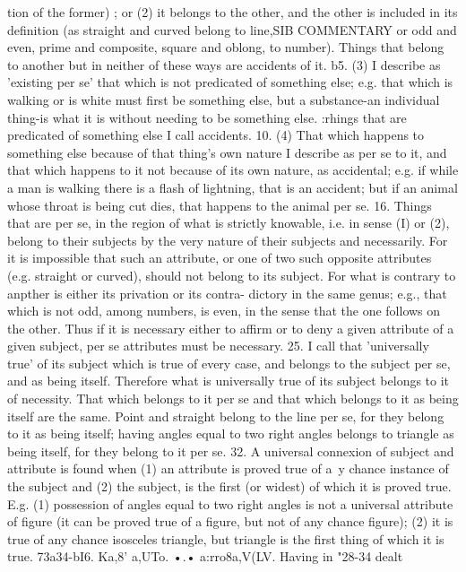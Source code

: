 {{{{tion of the former) ; or (2) it belongs to the other, and the other
is included in its definition (as straight and curved belong to line,SIB
COMMENTARY
or odd and even, prime and composite, square and oblong, to
number). Things that belong to another but in neither of these
ways are accidents of it.
b5. (3) I describe as 'existing per se' that which is not predicated
of something else; e.g. that which is walking or is white must
first be something else, but a substance-an individual thing-is
what it is without needing to be something else. :rhings that are
predicated of something else I call accidents.
10. (4) That which happens to something else because of that
thing's own nature I describe as per se to it, and that which
happens to it not because of its own nature, as accidental; e.g. if
while a man is walking there is a flash of lightning, that is an
accident; but if an animal whose throat is being cut dies, that
happens to the animal per se.
16. Things that are per se, in the region of what is strictly
knowable, i.e. in sense (I) or (2), belong to their subjects by the
very nature of their subjects and necessarily. For it is impossible
that such an attribute, or one of two such opposite attributes
(e.g. straight or curved), should not belong to its subject. For
what is contrary to anpther is either its privation or its contra-
dictory in the same genus; e.g., that which is not odd, among
numbers, is even, in the sense that the one follows on the other.
Thus if it is necessary either to affirm or to deny a given attribute
of a given subject, per se attributes must be necessary.
25. I call that 'universally true' of its subject which is true of
every case, and belongs to the subject per se, and as being itself.
Therefore what is universally true of its subject belongs to it
of necessity. That which belongs to it per se and that which
belongs to it as being itself are the same. Point and straight belong
to the line per se, for they belong to it as being itself; having
angles equal to two right angles belongs to triangle as being
itself, for they belong to it per se.
32. A universal connexion of subject and attribute is found
when (1) an attribute is proved true of a~y chance instance of the
subject and (2) the subject, is the first (or widest) of which it is
proved true. E.g. (1) possession of angles equal to two right
angles is not a universal attribute of figure (it can be proved true
of a figure, but not of any chance figure); (2) it is true of any
chance isosceles triangle, but triangle is the first thing of which
it is true.
73a34-bI6. Ka,8' a,UTo. •.• a:rro8a,V(LV. Having in "28-34 dealt
}}}}
